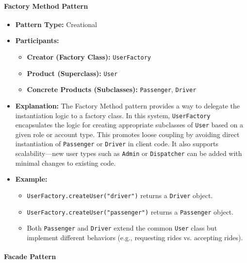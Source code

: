 \documentclass[12pt]{article}
\begin{document}
\paragraph{Factory Method Pattern}

\begin{itemize}
  \item \textbf{Pattern Type:} Creational
  \item \textbf{Participants:}
    \begin{itemize}
      \item \textbf{Creator (Factory Class):} \texttt{UserFactory}
      \item \textbf{Product (Superclass):} \texttt{User}
      \item \textbf{Concrete Products (Subclasses):} \texttt{Passenger}, \texttt{Driver}
    \end{itemize}
  \item \textbf{Explanation:} The Factory Method pattern provides a way to delegate the instantiation logic to a factory class. In this system, \texttt{UserFactory} encapsulates the logic for creating appropriate subclasses of \texttt{User} based on a given role or account type. This promotes loose coupling by avoiding direct instantiation of \texttt{Passenger} or \texttt{Driver} in client code. It also supports scalability—new user types such as \texttt{Admin} or \texttt{Dispatcher} can be added with minimal changes to existing code.
  \item \textbf{Example:}
    \begin{itemize}
      \item \texttt{UserFactory.createUser("driver")} returns a \texttt{Driver} object.
      \item \texttt{UserFactory.createUser("passenger")} returns a \texttt{Passenger} object.
      \item Both \texttt{Passenger} and \texttt{Driver} extend the common \texttt{User} class but implement different behaviors (e.g., requesting rides vs. accepting rides).
    \end{itemize}
\end{itemize}

\paragraph{Facade Pattern}
\end{document}

